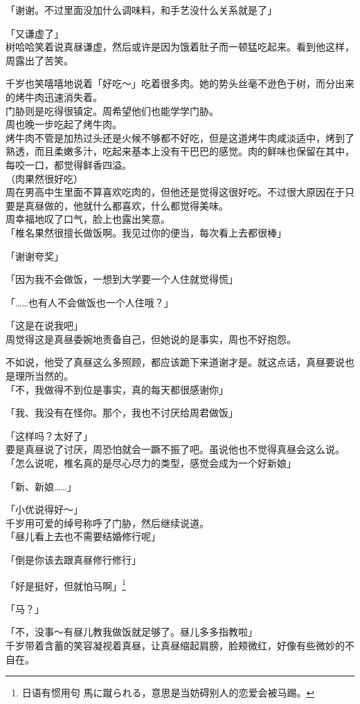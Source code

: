 「谢谢。不过里面没加什么调味料，和手艺没什么关系就是了」

「又谦虚了」\\

树哈哈笑着说真昼谦虚，然后或许是因为饿着肚子而一顿猛吃起来。看到他这样，周露出了苦笑。

千岁也笑嘻嘻地说着「好吃～」吃着很多肉。她的势头丝毫不逊色于树，而分出来的烤牛肉迅速消失着。\\

门胁则是吃得很镇定。周希望他们也能学学门胁。\\

周也晚一步吃起了烤牛肉。\\

烤牛肉不管是加热过头还是火候不够都不好吃，但是这道烤牛肉咸淡适中，烤到了熟透，而且柔嫩多汁，吃起来基本上没有干巴巴的感觉。肉的鲜味也保留在其中，每咬一口，都觉得鲜香四溢。\\

（肉果然很好吃）\\

周在男高中生里面不算喜欢吃肉的，但他还是觉得这很好吃。不过很大原因在于只要是真昼做的，他就什么都喜欢，什么都觉得美味。\\

周幸福地叹了口气，脸上也露出笑意。\\

「椎名果然很擅长做饭啊。我见过你的便当，每次看上去都很棒」

「谢谢夸奖」

「因为我不会做饭，一想到大学要一个人住就觉得慌」

「……也有人不会做饭也一个人住哦？」

「这是在说我吧」\\

周觉得这是真昼委婉地责备自己，但她说的是事实，周也不好抱怨。

不如说，他受了真昼这么多照顾，都应该跪下来道谢才是。就这点话，真昼要说也是理所当然的。\\

「不，我做得不到位是事实，真的每天都很感谢你」

「我、我没有在怪你。那个，我也不讨厌给周君做饭」

「这样吗？太好了」\\

要是真昼说了讨厌，周恐怕就会一蹶不振了吧。虽说他也不觉得真昼会这么说。\\

「怎么说呢，椎名真的是尽心尽力的类型，感觉会成为一个好新娘」

「新、新娘……」

「小优说得好～」\\

千岁用可爱的绰号称呼了门胁，然后继续说道。\\

「昼儿看上去也不需要结婚修行呢」

「倒是你该去跟真昼修行修行」

「好是挺好，但就怕马啊」\footnote{日语有惯用句 {\jpfont 馬に蹴られる}，意思是当妨碍别人的恋爱会被马踢。}

「马？」

「不，没事～有昼儿教我做饭就足够了。昼儿多多指教啦」\\

千岁带着含蓄的笑容凝视着真昼，让真昼缩起肩膀，脸颊微红，好像有些微妙的不自在。

